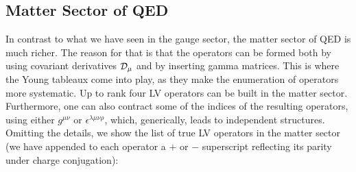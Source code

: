 \documentclass[12pt]{revtex4}
\begin{document}
\subsection{Matter Sector of QED}

	In contrast to what we have seen in the gauge sector, 
	the matter sector of QED is much
	richer.
	The reason for that is that the operators can be formed both
	by using covariant derivatives $ \cal{D}_\mu $ and by 
	inserting gamma matrices.
	This is where the Young tableaux come into play,
	as they make the enumeration of operators more systematic.
	Up to rank four LV operators can be built in the matter sector.
	Furthermore, one can also contract some of the indices of the
	resulting operators, using either $ g^{\mu\nu} $ or $ \epsilon^{\lambda\mu\nu\rho} $,
	which, generically, leads to independent structures.
	Omitting the details, we show the list of true LV operators
	in the matter sector
	(we have appended to each operator a $+$ or $-$ superscript reflecting
	its parity under charge conjugation):
\end{document}
